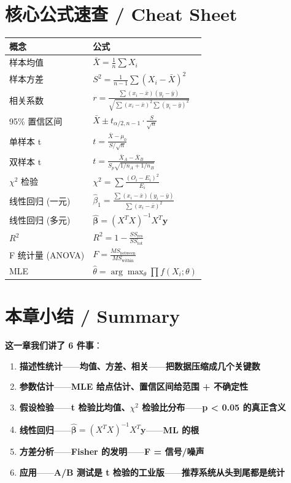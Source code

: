 \section{核心公式速查 / Cheat Sheet}

\begin{center}
\begin{tabular}{|l|l|}
\hline
\textbf{概念} & \textbf{公式} \\ \hline
样本均值 & $\bar{X} = \frac{1}{n}\sum X_i$ \\ \hline
样本方差 & $S^2 = \frac{1}{n-1}\sum(X_i - \bar{X})^2$ \\ \hline
相关系数 & $r = \frac{\sum(x_i-\bar{x})(y_i-\bar{y})}{\sqrt{\sum(x_i-\bar{x})^2 \sum(y_i-\bar{y})^2}}$ \\ \hline
95\% 置信区间 & $\bar{X} \pm t_{\alpha/2, n-1} \cdot \frac{S}{\sqrt{n}}$ \\ \hline
单样本 t & $t = \frac{\bar{X} - \mu_0}{S/\sqrt{n}}$ \\ \hline
双样本 t & $t = \frac{\bar{X}_A - \bar{X}_B}{S_p \sqrt{1/n_A + 1/n_B}}$ \\ \hline
$\chi^2$ 检验 & $\chi^2 = \sum \frac{(O_i - E_i)^2}{E_i}$ \\ \hline
线性回归 (一元) & $\hat{\beta}_1 = \frac{\sum(x_i-\bar{x})(y_i-\bar{y})}{\sum(x_i-\bar{x})^2}$ \\ \hline
线性回归 (多元) & $\hat{\boldsymbol{\beta}} = (X^T X)^{-1} X^T \mathbf{y}$ \\ \hline
$R^2$ & $R^2 = 1 - \frac{SS_{\text{res}}}{SS_{\text{tot}}}$ \\ \hline
F 统计量 (ANOVA) & $F = \frac{MS_{\text{between}}}{MS_{\text{within}}}$ \\ \hline
MLE & $\hat{\theta} = \arg\max_\theta \prod f(X_i; \theta)$ \\ \hline
\end{tabular}
\end{center}

\section{本章小结 / Summary}

\textbf{这一章我们讲了 6 件事}：

\begin{enumerate}
\item \textbf{描述性统计}——\textbf{均值、方差、相关}——\textbf{把数据压缩成几个关键数}
\item \textbf{参数估计}——\textbf{MLE 给点估计、置信区间给范围 + 不确定性}
\item \textbf{假设检验}——\textbf{t 检验比均值、$\chi^2$ 检验比分布}——\textbf{p < 0.05 的真正含义}
\item \textbf{线性回归}——\textbf{$\hat{\boldsymbol{\beta}} = (X^T X)^{-1} X^T \mathbf{y}$}——\textbf{ML 的根}
\item \textbf{方差分析}——\textbf{Fisher 的发明}——\textbf{F = 信号/噪声}
\item \textbf{应用}——\textbf{A/B 测试是 t 检验的工业版}——\textbf{推荐系统从头到尾都是统计}
\end{enumerate}


